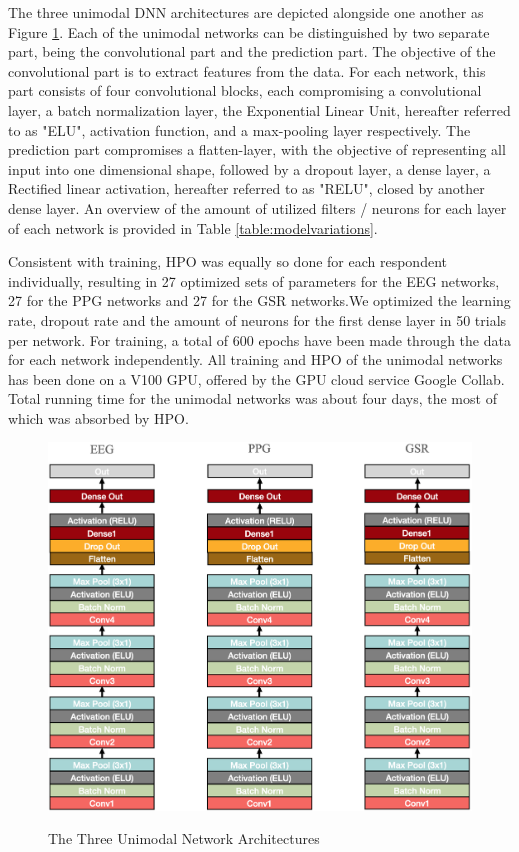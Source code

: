 \documentclass[12pt]{article}
\begin{document}
The three unimodal DNN architectures are depicted alongside one another as Figure \ref{fig:singlearchitecture}. Each of the unimodal networks can be distinguished by two separate part, being the convolutional part and the prediction part.  The objective of the convolutional part is to extract features from the data. For each network, this part consists of four convolutional blocks, each compromising a convolutional layer, a batch normalization layer, the Exponential Linear Unit, hereafter referred to as "ELU", activation function, and a max-pooling layer respectively. The prediction part compromises a flatten-layer,  with the objective of representing all input into one dimensional shape, followed by a dropout layer, a dense layer, a Rectified linear activation, hereafter referred to as "RELU", closed by another dense layer. An overview of the amount of utilized filters / neurons for each layer of each network is provided in Table \ref{table:modelvariations}. 

Consistent with training, HPO was equally so done for each respondent individually, resulting in 27 optimized sets of parameters for the EEG networks, 27 for the PPG networks and 27 for the GSR networks.We optimized the learning rate, dropout rate and the amount of neurons for the first dense layer in 50 trials per network.  For training, a total of 600 epochs have been made through the data for each network independently. All training and HPO of the unimodal networks has been done on a V100 GPU,  offered by the GPU cloud service Google Collab.  Total running time for the unimodal networks was about four days, the most of which was absorbed by HPO. 

\begin{figure}
\caption{The Three Unimodal Network Architectures}
\bigskip
\includegraphics[scale=0.69]{single_model_architecture}
\label{fig:singlearchitecture}
\end{figure}
\restoregeometry
\end{document}
